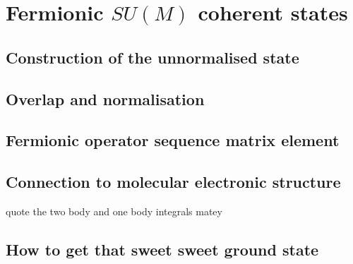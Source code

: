 \section{Fermionic $SU(M)$ coherent states}

\subsection{Construction of the unnormalised state}

\subsection{Overlap and normalisation}

\subsection{Fermionic operator sequence matrix element}

\subsection{Connection to molecular electronic structure}
quote the two body and one body integrals matey

\subsection{How to get that sweet sweet ground state}